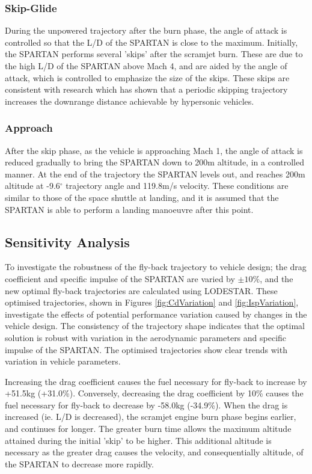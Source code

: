 \subsubsection{ Skip-Glide}
During the unpowered trajectory after the burn phase, the angle of attack is controlled so that the L/D of the SPARTAN is close to the maximum. Initially, the SPARTAN performs several 'skips' after the scramjet burn. These are due to the high L/D of the SPARTAN above Mach 4, and are aided by the angle of attack, which is controlled to emphasize the size of the skips. These skips are consistent with research which has shown that a periodic skipping trajectory increases the downrange distance achievable by hypersonic vehicles\cite{Eggers1957,Kanda2007}. 


\subsubsection{ Approach}
After the skip phase, as the vehicle is approaching Mach 1, the angle of attack is reduced gradually to bring the SPARTAN down to 200m altitude, in a controlled manner. 
At the end of the trajectory the SPARTAN levels out, and reaches 200m altitude at -9.6$^\circ$ trajectory angle and 119.8m/s velocity. These conditions are similar to those of the space shuttle at landing\cite{Ryba2017}, and it is assumed that the SPARTAN is able to perform a landing manoeuvre after this point. 








\subsection{Sensitivity Analysis}
To investigate the robustness of the fly-back trajectory to vehicle design; the drag coefficient and specific impulse of the SPARTAN are varied by $\pm 10\%$, and the new optimal fly-back trajectories are calculated using LODESTAR. These optimised trajectories, shown in Figures \ref{fig:CdVariation} and \ref{fig:IspVariation}, investigate the effects of potential performance variation caused by changes in the vehicle design.
The consistency of the trajectory shape indicates that the optimal solution is robust with variation in the aerodynamic parameters and specific impulse of the SPARTAN. The optimised trajectories show clear trends with variation in vehicle parameters.

Increasing the drag coefficient causes the fuel necessary for fly-back to increase by +51.5kg (+31.0\%). Conversely, decreasing the drag coefficient by 10\% causes the fuel necessary for  fly-back to decrease by -58.0kg (-34.9\%). 
When the drag is increased (ie. L/D is decreased), the scramjet engine burn phase begins earlier, and continues for longer. 
The greater burn time allows the maximum altitude attained during the initial 'skip' to be higher. 
This additional altitude is necessary as the greater drag causes the velocity, and consequentially altitude, of the SPARTAN to decrease more rapidly.



